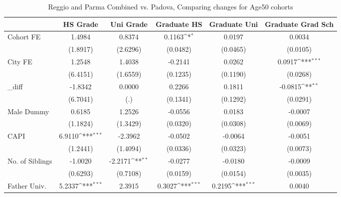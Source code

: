 \begin{table}[htbp]\centering
\def\sym#1{\ifmmode^{#1}\else\(^{#1}\)\fi}
\caption{Reggio and Parma Combined vs. Padova, Comparing changes for Age50 cohorts}
\begin{tabular}{l*{5}{c}}
\toprule
            &\multicolumn{1}{c}{HS Grade}&\multicolumn{1}{c}{Uni Grade}&\multicolumn{1}{c}{Graduate HS}&\multicolumn{1}{c}{Graduate Uni}&\multicolumn{1}{c}{Graduate Grad Sch}\\
\midrule
Cohort FE   &      1.4984         &      0.8374         &      0.1163\sym{*}  &      0.0197         &      0.0034         \\
            &    (1.8917)         &    (2.6296)         &    (0.0482)         &    (0.0465)         &    (0.0105)         \\
\addlinespace
City FE     &      1.2548         &      1.4038         &     -0.2141         &      0.0262         &      0.0917\sym{***}\\
            &    (6.4151)         &    (1.6559)         &    (0.1235)         &    (0.1190)         &    (0.0268)         \\
\addlinespace
\_diff       &     -1.8342         &      0.0000         &      0.2266         &      0.1811         &     -0.0815\sym{**} \\
            &    (6.7041)         &         (.)         &    (0.1341)         &    (0.1292)         &    (0.0291)         \\
\addlinespace
Male Dummy  &      0.6185         &      1.2526         &     -0.0556         &      0.0183         &     -0.0007         \\
            &    (1.1824)         &    (1.3429)         &    (0.0320)         &    (0.0308)         &    (0.0069)         \\
\addlinespace
CAPI        &      6.9110\sym{***}&     -2.3962         &     -0.0502         &     -0.0064         &     -0.0051         \\
            &    (1.2441)         &    (1.4094)         &    (0.0336)         &    (0.0323)         &    (0.0073)         \\
\addlinespace
No. of Siblings&     -1.0020         &     -2.2171\sym{**} &     -0.0277         &     -0.0180         &     -0.0009         \\
            &    (0.6293)         &    (0.7108)         &    (0.0159)         &    (0.0154)         &    (0.0035)         \\
\addlinespace
Father Univ.&      5.2337\sym{***}&      2.3915         &      0.3027\sym{***}&      0.2195\sym{***}&      0.0040         \\

\end{tabular}
\end{table}
